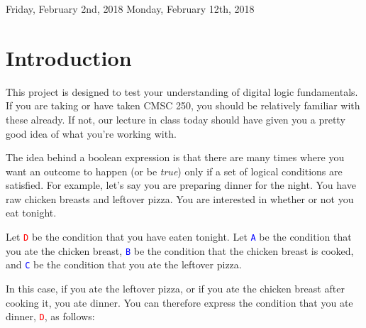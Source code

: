 \documentclass{article}
\begin{document}
\newcommand{\mysubsection}[1]{
    {\fontsize{13}{15}\selectfont\bf \item #1}}
    
\newenvironment{subenv}[1]
{\section{#1}\vspace{.5em}\begin{enumerate}}
{\end{enumerate}}

\newcommand{\varin}[1]{\textcolor{blue}{\texttt{#1}}}
\newcommand{\varout}[1]{\textcolor{red}{\texttt{#1}}}



\large

            {Friday, February 2nd, 2018}
            {Monday, February 12th, 2018}

\section{Introduction}
    \par This project is designed to test your understanding of digital logic fundamentals.  If you are taking or have taken CMSC 250, you should be relatively familiar with these already.  If not, our lecture in class today should have given you a pretty good idea of what you're working with.
    
    \par The idea behind a boolean expression is that there are many times where you want an outcome to happen (or be \emph{true}) only if a set of logical conditions are satisfied.  For example, let's say you are preparing dinner for the night.  You have raw chicken breasts and leftover pizza.  You are interested in whether or not you eat tonight.  
    
    \par Let \varout{D} be the condition that you have eaten tonight.  Let \varin{A} be the condition that you ate the chicken breast, \varin{B} be the condition that the chicken breast is cooked, and \varin{C} be the condition that you ate the leftover pizza.
    
    \par In this case, if you ate the leftover pizza, or if you ate the chicken breast after cooking it, you ate dinner.  You can therefore express the condition that you ate dinner, \varout{D}, as follows:
    
\end{document}
